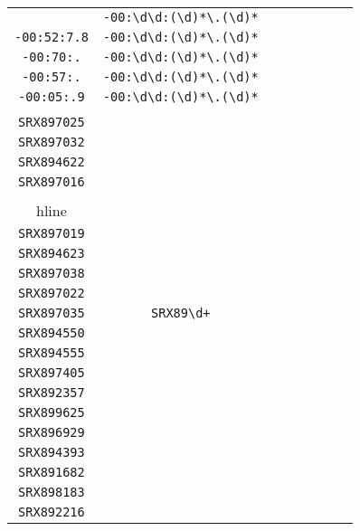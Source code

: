 \begin{longtable}{cccccccc}
\begin{tabular}{ll}
    \verb|-00:43:6.| & \verb|-00:\d\d:(\d)*\.(\d)*|\\
\verb|-00:52:7.8| & \verb|-00:\d\d:(\d)*\.(\d)*|\\
\verb|-00:70:.| & \verb|-00:\d\d:(\d)*\.(\d)*|\\
\verb|-00:57:.| & \verb|-00:\d\d:(\d)*\.(\d)*|\\
\verb|-00:05:.9| & \verb|-00:\d\d:(\d)*\.(\d)*|
\end{tabular}
\\\midrule 
\begin{tabular}{l}
    \verb|SRX897027|\\
\verb|SRX897025|\\
\verb|SRX897032|\\
\verb|SRX894622|\\
\verb|SRX897016|\\
\\hline\\
\verb|SRX897019|\\
\verb|SRX894623|\\
\verb|SRX897038|\\
\verb|SRX897022|\\
\verb|SRX897035|
\end{tabular}

&
\verb|SRX89\d+|
&

\begin{tabular}{l}
    \verb|SRX89\d\d\d\d|\\
\verb|SRX894550|\\
\verb|SRX894555|\\
\verb|SRX897405|\\
\verb|SRX892357|\\
\verb|SRX899625|
\end{tabular}

&

\begin{tabular}{l}
    \verb|SRX89\d\d\d\d|\\
\verb|SRX896929|\\
\verb|SRX894393|\\
\verb|SRX891682|\\
\verb|SRX898183|\\
\verb|SRX892216|
\end{tabular}

&


\end{longtable}
